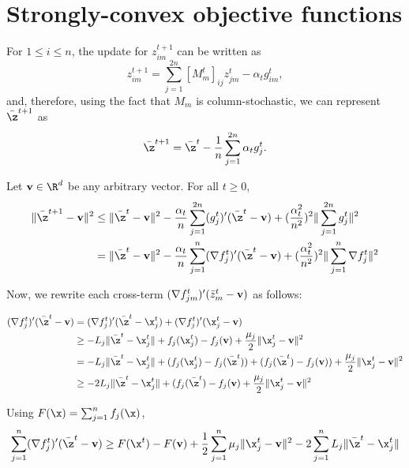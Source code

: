 \documentclass[a4paper,11pt]{article}
\begin{document}
\section{Strongly-convex objective functions}

For $1 \leq i \leq n$, the update for $z_{im}^{t+1}$ can be written as
\begin{equation}
z_{im}^{t+1}=\sum_{j=1}^{2n}[M_m^t]_{ij} z_{jm}^t-\alpha_t g_{im}^t,
\end{equation}
and, therefore, using the fact that $M_m$ is column-stochastic, we can represent $\Bar{\z}^{t+1}$ as
\begin{equation}
    \Bar{\z}^{t+1}=\Bar{\z}^{t}-\frac{1}{n}\sum_{j=1}^{2n}\alpha_{t}g_{j}^{t}.
\end{equation}

Let $\mathbf{v} \in \R^d$ be any arbitrary vector. For all $t \geq 0$, 
\begin{align}
    \|\Bar{\z}^{t+1}-\mathbf{v}   \|^2 & \leq \|\Bar{\z}^{t}-\mathbf{v} \|^2 -\frac{\alpha_{t}}{n}\sum_{j=1}^{2n} (g_{j}^{t})' (\Bar{\z}^{t}-\mathbf{v} )+(\frac{\alpha^2_{t}}{n^2})^2 \| \sum_{j=1}^{2n} g_{j}^{t} \|^2  \\
    & = \|\Bar{\z}^{t}-\mathbf{v} \|^2 -\frac{\alpha_{t}}{n}\sum_{j=1}^{n} (\nabla f_{j}^{t})' (\Bar{\z}^{t}-\mathbf{v} )+(\frac{\alpha^2_{t}}{n^2})^2 \| \sum_{j=1}^{n} \nabla f_{j}^{t} \|^2
\end{align}

Now, we rewrite each cross-term $(\nabla f_{jm}^{t})' (\Bar{z}_m^{t}-\mathbf{v} ) $ as follows:

\begin{align}
    (\nabla f_{j}^{t})' (\Bar{\z}^{t}-\mathbf{v} ) & = (\nabla f_{j}^{t})' (\Bar{\z}^{t}-\x_{j}^{t} )+(\nabla f_{j}^{t})' (\x_{j}^{t}-\mathbf{v} ) \\
    & \geq -L_j\| \Bar{\z}^{t}-\x_j^{t} \| + f_j(\x_{j}^t)-f_j(\mathbf{v}) +\frac{\mu_j}{2}\| \x_{j}^{t}-\mathbf{v}\|^2 \\
    & = -L_j\| \Bar{\z}^{t}-\x_j^{t} \| +
    (f_j(\x_{j}^t)-f_j(\Bar{\z}^{t}) )+(f_j(\Bar{\z}^{t})-f_j(\mathbf{v}))+\frac{\mu_j}{2}\| \x_{j}^{t}-\mathbf{v}\|^2 \\
    & \geq -2 L_j\| \Bar{\z}^{t}-\x_j^{t} \| +(f_j(\Bar{\z}^{t})-f_j(\mathbf{v})+\frac{\mu_j}{2}\| \x_{j}^{t}-\mathbf{v}\|^2 
\end{align}

Using $F(\x)=\sum_{j=1}^n f_j(\x)$, 
\begin{equation}
    \sum_{j=1}^n (\nabla f_{j}^{t})' (\Bar{\z}^{t}-\mathbf{v} ) \geq F(\x^t)-F(\mathbf{v}) + \frac{1}{2}\sum_{j=1}^n \mu_j \| \x_{j}^{t}-\mathbf{v}\|^2 - 2\sum_{j=1}^n L_j\| \Bar{\z}^{t}-\x_j^{t} \|
\end{equation}
\end{document}
